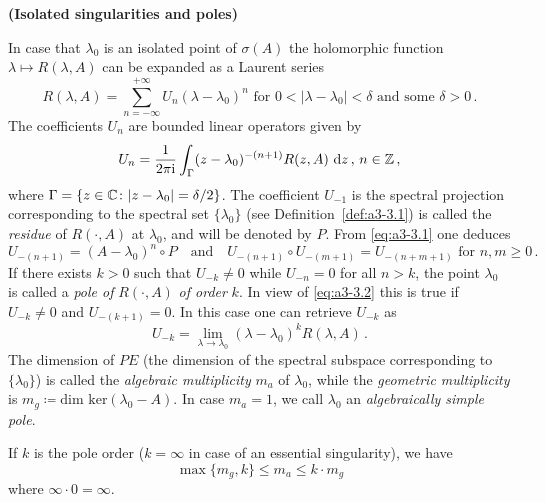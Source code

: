 \begin{example}{\textbf{(Isolated singularities and poles)}}\label{ex:a3-3.6}

In case that $\lambda_{0}$ is an isolated point of $\sigma(A)$ the holomorphic function $\lambda \mapsto R(\lambda,A)$ can be expanded as a Laurent series
\[
R(\lambda,A) = \sum_{n=-\infty}^{+\infty} U_{n}(\lambda - \lambda_{0})^{n} \text{ for } 0 < |\lambda - \lambda_{0}| < \delta \text{ and some } \delta > 0\,.
\]
The coefficients $U_{n}$ are bounded linear operators given by
\begin{equation}\label{eq:a3-3.1}
U_{n} = \frac{1}{2\pi\mathrm{i} }\int_{\Gamma} (z - \lambda_{0})^{-(n+1)}R(z,A) \, \mathop{}\!\mathrm{d}{z} \, , \, n \in \mathbb{Z}\,,
\end{equation}
where $\Gamma = \{z \in \mathbb{C} \colon |z - \lambda_{0}| = \delta/2\}$.
The coefficient $U_{-1}$ is the spectral projection corresponding to the spectral set $\{\lambda_{0}\}$ (see Definition~\ref{def:a3-3.1}) is called the \emph{residue} of $R(\cdot,A)$ at $\lambda_{0}$, and will be denoted by $P$.
From \eqref{eq:a3-3.1} one deduces
\begin{equation}\label{eq:a3-3.2}
U_{-(n+1)} = (A - \lambda_{0})^{n} \circ P \quad \text{and} \quad U_{-(n+1)} \circ U_{-(m+1)} = U_{-(n+m+1)} \text{ for } n, m \geq 0\,.
\end{equation}
If there exists $k > 0$ such that $U_{-k} \neq 0$ while $U_{-n} = 0$ for all $n > k$, the point $\lambda_{0}$ is called a \emph{pole of} $R(\cdot,A)$ \emph{of order} $k$.
In view of \eqref{eq:a3-3.2} this is true if $U_{-k} \neq 0$ and $U_{-(k+1)} = 0$.
In this case one can retrieve $U_{-k}$ as
\begin{equation}\label{eq:a3-3.3}
U_{-k} = \lim_{\lambda \to \lambda_{0}} (\lambda - \lambda_{0})^{k}R(\lambda,A)\,.
\end{equation}
The dimension of $PE$ (\ie the dimension of the spectral subspace corresponding to $\{\lambda_{0}\}$) is called the \emph{algebraic multiplicity} $m_{a}$ of $\lambda_{0}$, while the \emph{geometric multiplicity} is $m_{g} \coloneqq \text{dim ker}(\lambda_{0} - A)$.
In case $m_{a} = 1$, we call $\lambda_{0}$ an \emph{algebraically simple pole}.

If $k$ is the pole order ($k = \infty$ in case of an essential singularity), we have
\begin{equation}\label{eq:a3-3.4}
	\max\{m_{g},k\} \leq m_{a} \leq k \cdot m_{g}
\end{equation}
where $\infty \cdot 0 = \infty$.


\end{example}
